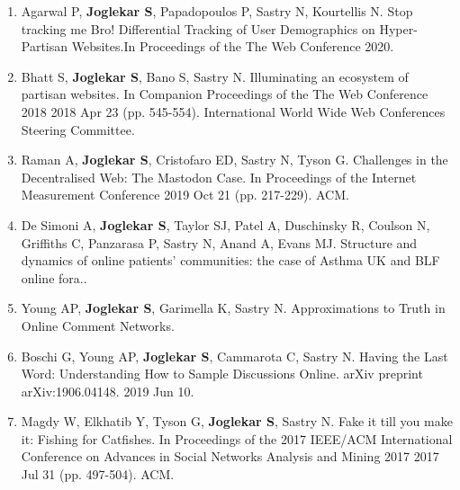 \begin{enumerate}
    \item Agarwal P, \textbf{Joglekar S}, Papadopoulos P, Sastry N, Kourtellis N. Stop tracking me Bro! Differential Tracking of User Demographics on Hyper-Partisan Websites.In Proceedings of the The Web Conference 2020.
    
    \item Bhatt S, \textbf{Joglekar S}, Bano S, Sastry N. Illuminating an ecosystem of partisan websites. In Companion Proceedings of the The Web Conference 2018 2018 Apr 23 (pp. 545-554). International World Wide Web Conferences Steering Committee.
    
    \item Raman A, \textbf{Joglekar S}, Cristofaro ED, Sastry N, Tyson G. Challenges in the Decentralised Web: The Mastodon Case. In Proceedings of the Internet Measurement Conference 2019 Oct 21 (pp. 217-229). ACM.
    
    \item De Simoni A, \textbf{Joglekar S}, Taylor SJ, Patel A, Duschinsky R, Coulson N, Griffiths C, Panzarasa P, Sastry N, Anand A, Evans MJ. Structure and dynamics of online patients’ communities: the case of Asthma UK and BLF online fora..
    
    \item Young AP, \textbf{Joglekar S}, Garimella K, Sastry N. Approximations to Truth in Online Comment Networks.
    
    \item Boschi G, Young AP, \textbf{Joglekar S}, Cammarota C, Sastry N. Having the Last Word: Understanding How to Sample Discussions Online. arXiv preprint arXiv:1906.04148. 2019 Jun 10.
    
    \item Magdy W, Elkhatib Y, Tyson G, \textbf{Joglekar S}, Sastry N. Fake it till you make it: Fishing for Catfishes. In Proceedings of the 2017 IEEE/ACM International Conference on Advances in Social Networks Analysis and Mining 2017 2017 Jul 31 (pp. 497-504). ACM.    
   
\end{enumerate}


